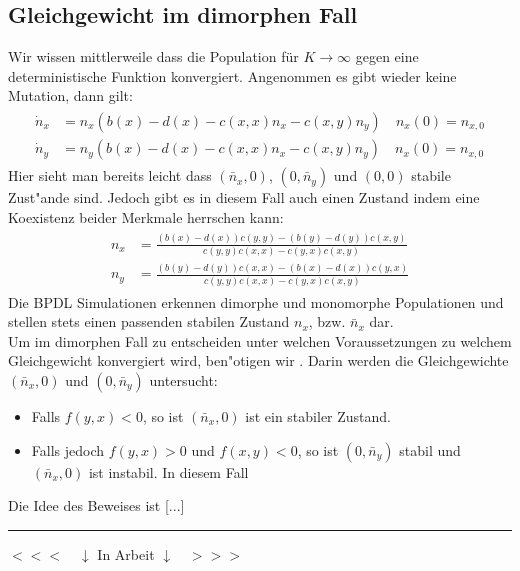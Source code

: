 \documentclass[11pt, a4paper, german]{article}
\begin{document}
	\subsection{Gleichgewicht im dimorphen Fall}
	Wir wissen mittlerweile dass die Population für $ K \to \infty $ gegen eine deterministische Funktion konvergiert. Angenommen es gibt wieder keine Mutation, dann gilt:\\
	\begin{align}
	\begin{split}
		\dot{n}_x & = n_x (b(x) - d(x) - c(x,x)n_x - c(x,y) n_y) \quad n_x(0) = n_{x,0} \\
		\dot{n}_y & = n_y (b(x) - d(x) - c(x,x)n_x - c(x,y) n_y) \quad n_x(0) = n_{x,0}
	\end{split}
	\end{align}
	Hier sieht man bereits leicht dass $ (\bar{n}_x, 0) $, $ (0, \bar{n}_y) $ und $ (0,0) $ stabile Zust"ande sind. Jedoch gibt es in diesem Fall auch einen Zustand indem eine Koexistenz beider Merkmale herrschen kann:
	\begin{align}
	\begin{split}
		n_x &= \frac{(b(x) - d(x))c(y,y)-(b(y)-d(y))c(x,y)}{c(y,y)c(x,x) - c(y,x)c(x,y)}\\
		n_y &= \frac{(b(y) - d(y))c(x,x)-(b(x)-d(x))c(y,x)}{c(y,y)c(x,x) - c(y,x)c(x,y)}
	\end{split}
	\end{align}
	Die BPDL Simulationen erkennen dimorphe und monomorphe Populationen und stellen stets einen passenden stabilen Zustand $ n_x $, bzw. $ \bar{n}_x $ dar. \\
	Um im dimorphen Fall zu entscheiden unter welchen Voraussetzungen zu welchem Gleichgewicht konvergiert wird, ben"otigen wir \cite[Proposition 3]{Champagnat20061127}. Darin werden die Gleichgewichte $ (\bar{n}_x, 0) $ und $ (0, \bar{n}_y) $ untersucht:
	\begin{itemize}
		\item[] Falls $ f(y,x) < 0 $, so ist $ (\bar{n}_x, 0) $ ist ein stabiler Zustand.
		\item[] Falls jedoch $ f(y,x) > 0 $ und $ f(x,y) < 0 $, so ist $ (0, \bar{n}_y) $ stabil und $ (\bar{n}_x, 0) $ ist instabil. In diesem Fall
	\end{itemize}
	Die Idee des Beweises ist [...]

\clearpage
	\noindent\rule{\textwidth}{2pt}
	\begin{center}
		$ <<< \quad \downarrow $ In Arbeit $ \downarrow \quad >>> $
	\end{center}
\end{document}
